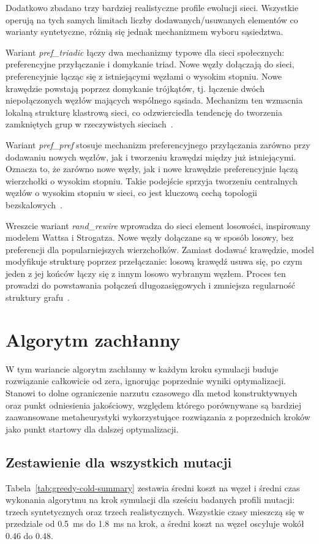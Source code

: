 Dodatkowo zbadano trzy bardziej realistyczne profile ewolucji sieci. Wszystkie operują na tych samych limitach liczby dodawanych/usuwanych elementów co warianty syntetyczne, różnią się jednak mechanizmem wyboru sąsiedztwa.

Wariant \emph{pref\_triadic} łączy dwa mechanizmy typowe dla sieci społecznych: preferencyjne przyłączanie i domykanie triad. Nowe węzły dołączają do sieci, preferencyjnie łącząc się z istniejącymi węzłami o wysokim stopniu. Nowe krawędzie powstają poprzez domykanie trójkątów, tj. łączenie dwóch niepołączonych węzłów mających wspólnego sąsiada. Mechanizm ten wzmacnia lokalną strukturę klastrową sieci, co odzwierciedla tendencję do tworzenia zamkniętych grup w rzeczywistych sieciach~\cite{albert2002statistical,kamola2016dynamika}.

Wariant \emph{pref\_pref} stosuje mechanizm preferencyjnego przyłączania zarówno przy dodawaniu nowych węzłów, jak i tworzeniu krawędzi między już istniejącymi. Oznacza to, że zarówno nowe węzły, jak i nowe krawędzie preferencyjnie łączą wierzchołki o wysokim stopniu. Takie podejście sprzyja tworzeniu centralnych węzłów o wysokim stopniu w sieci, co jest kluczową cechą topologii bezskalowych~\cite{albert2002statistical}.

Wreszcie wariant \emph{rand\_rewire} wprowadza do sieci element losowości, inspirowany modelem Wattsa i Strogatza. Nowe węzły dołączane są w sposób losowy, bez preferencji dla popularniejszych wierzchołków. Zamiast dodawać krawędzie, model modyfikuje strukturę poprzez przełączanie: losową krawędź usuwa się, po czym jeden z jej końców łączy się z innym losowo wybranym węzłem. Proces ten prowadzi do powstawania połączeń długozasięgowych i zmniejsza regularność struktury grafu~\cite{watts1998collective}.



\section{Algorytm zachłanny}

W tym wariancie algorytm zachłanny w każdym kroku symulacji buduje rozwiązanie całkowicie od zera, ignorując poprzednie wyniki optymalizacji. Stanowi to dolne ograniczenie narzutu czasowego dla metod konstruktywnych oraz punkt odniesienia jakościowy, względem którego porównywane są bardziej zaawansowane metaheurystyki wykorzystujące rozwiązania z poprzednich kroków jako punkt startowy dla dalszej optymalizacji.

\subsection{Zestawienie dla wszystkich mutacji}
Tabela~\ref{tab:greedy-cold-summary} zestawia średni koszt na węzeł i średni czas wykonania algorytmu na krok symulacji dla sześciu badanych profili mutacji: trzech syntetycznych oraz trzech realistycznych. Wszystkie czasy mieszczą się w przedziale od \SI{0.5}{\milli\second} do \SI{1.8}{\milli\second} na krok, a średni koszt na węzeł oscyluje wokół 0.46 do 0.48.

